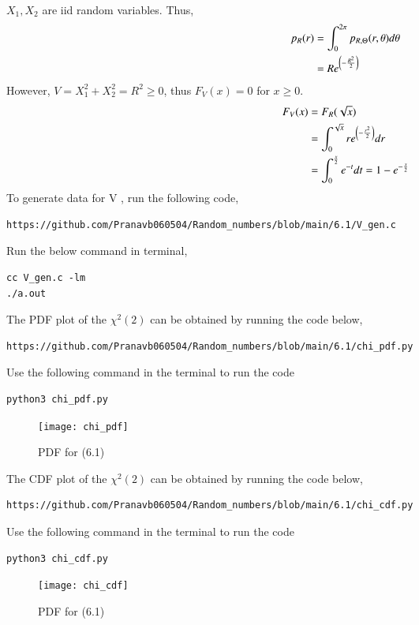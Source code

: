\documentclass[journal,12pt,twocolumn]{IEEEtran}
\renewcommand\thesection{\arabic{section}}
\begin{document}
\begin{enumerate}[label=\thesection.\arabic*
,ref=\thesection.\theenumi]
\begin{align}
		\end{align}
   $X_1, X_2$ are iid random variables. Thus,
		\begin{align}
			p_R(r) &= \int_{0}^{2\pi}p_{R, \Theta}(r, \theta)d\theta \\
			&= R e^{\left(-\frac{R^2}{2}\right)}
		\end{align}
However, $V = X_1^2 + X_2^2 = R^2 \geq 0$, thus $F_V(x) = 0$ for $x \geq 0$.
		\begin{align}
			F_V(x) &= F_R(\sqrt{x}) \\ 
			&= \int_{0}^{\sqrt{x}}r e^{\left(-\frac{r^2}{2}\right)}dr \\
			&= \int_{0}^{\frac{x}{2}}e^{-t}dt = 1 - e^{-\frac{x}{2}}
		\end{align}
To generate data for V , run the following code,
\begin{lstlisting}
https://github.com/Pranavb060504/Random_numbers/blob/main/6.1/V_gen.c
\end{lstlisting}
Run the below command in terminal,
\begin{lstlisting}
cc V_gen.c -lm
./a.out
\end{lstlisting}
The PDF plot of the $\chi^{2} (2)$ can be obtained by running the code below,
\begin{lstlisting}
https://github.com/Pranavb060504/Random_numbers/blob/main/6.1/chi_pdf.py
\end{lstlisting}
Use the following command in the terminal to run the code
\begin{lstlisting}
python3 chi_pdf.py
\end{lstlisting}
\begin{figure}
\texttt{[image: chi\_pdf]}
\caption{PDF for (6.1)}
\label{fig:chi_PDF}
\end{figure}
The CDF plot of the $\chi^{2} (2)$ can be obtained by running the code below,
\begin{lstlisting}
https://github.com/Pranavb060504/Random_numbers/blob/main/6.1/chi_cdf.py
\end{lstlisting}
Use the following command in the terminal to run the code
\begin{lstlisting}
python3 chi_cdf.py
\end{lstlisting}
\begin{figure}
\texttt{[image: chi\_cdf]}
\caption{PDF for (6.1)}
\label{fig:chi_PDF}
\end{figure}


\end{enumerate}
\end{document}
